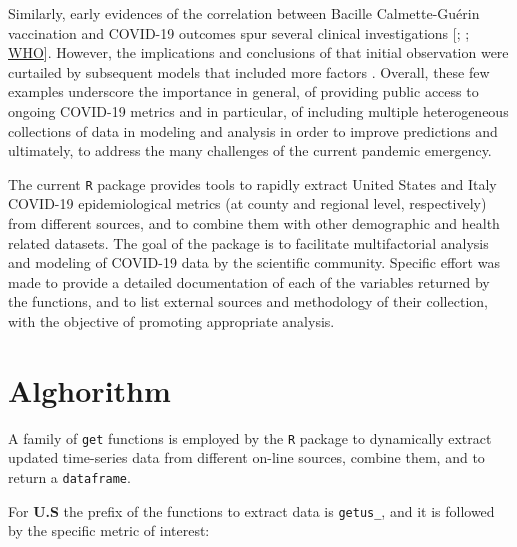 \documentclass[12pt,halfline,a4paper,]{ouparticle}
\begin{document}
Similarly, early evidences of the correlation between Bacille
Calmette-Guérin vaccination and COVID-19 outcomes spur several clinical
investigations {[}\citet{miller2020m}; \citet{shet2020m};
\href{https://www.who.int/news-room/commentaries/detail/bacille-calmette-gu\%C3\%A9rin-(bcg)-vaccination-and-covid-19}{WHO}{]}.
However, the implications and conclusions of that initial observation
were curtailed by subsequent models that included more factors
\citep[e.s. age;][]{fukui2020m}. Overall, these few examples underscore
the importance in general, of providing public access to ongoing
COVID-19 metrics and in particular, of including multiple heterogeneous
collections of data in modeling and analysis in order to improve
predictions and ultimately, to address the many challenges of the
current pandemic emergency.

The current \texttt{R} package provides tools to rapidly extract United
States and Italy COVID-19 epidemiological metrics (at county and
regional level, respectively) from different sources, and to combine
them with other demographic and health related datasets. The goal of the
package is to facilitate multifactorial analysis and modeling of
COVID-19 data by the scientific community. Specific effort was made to
provide a detailed documentation of each of the variables returned by
the functions, and to list external sources and methodology of their
collection, with the objective of promoting appropriate analysis.

\hypertarget{alghorithm}{%
\section{Alghorithm}\label{alghorithm}}

A family of \texttt{get} functions is employed by the \texttt{R} package
to dynamically extract updated time-series data from different on-line
sources, combine them, and to return a \texttt{dataframe}.

For \textbf{U.S} the prefix of the functions to extract data is
\texttt{getus\_}, and it is followed by the specific metric of interest:
\end{document}
